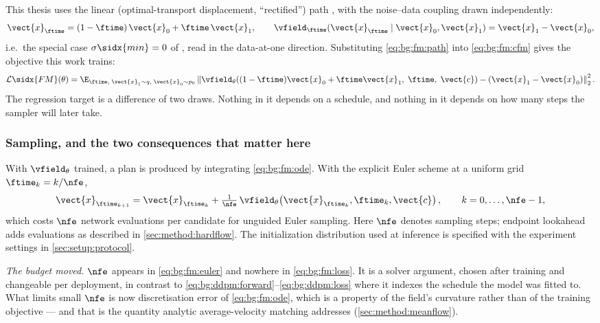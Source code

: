 This thesis uses the linear (optimal-transport displacement, ``rectified'')
path \parencite{lipman2023flow,liu2023flow}, with the noise--data coupling drawn independently:
\begin{equation}\label{eq:bg:fm:path}
  \vect{x}_{\ftime} = (1-\ftime)\,\vect{x}_{0} + \ftime\,\vect{x}_{1},
  \qquad
  \vfield_{\ftime}(\vect{x}_{\ftime}\mid \vect{x}_{0},\vect{x}_{1}) = \vect{x}_{1} - \vect{x}_{0},
\end{equation}
i.e.\ the special case $\sigma\sidx{min} = 0$ of \parencite[Eq.~(20)--(23)]{lipman2023flow}, read in
the data-at-one direction. Substituting \eqref{eq:bg:fm:path} into \eqref{eq:bg:fm:cfm} gives
the objective this work trains:
\begin{equation}\label{eq:bg:fm:loss}
  \mathcal{L}\sidx{FM}(\theta)
  = \E_{\ftime,\;\vect{x}_{1}\sim q,\;\vect{x}_{0}\sim p_{0}}
    \left\|\vfield_{\theta}\!\left((1-\ftime)\vect{x}_{0} + \ftime\vect{x}_{1},\;\ftime,\;\vect{c}\right)
      - \left(\vect{x}_{1}-\vect{x}_{0}\right)\right\|_{2}^{2}.
\end{equation}
The regression target is a difference of two draws. Nothing in it depends on a schedule, and
nothing in it depends on how many steps the sampler will later take.

\subsubsection*{Sampling, and the two consequences that matter here}

With $\vfield_{\theta}$ trained, a plan is produced by integrating \eqref{eq:bg:fm:ode}. With
the explicit Euler scheme at a uniform grid $\ftime_{k} = k/\nfe$,
\begin{equation}\label{eq:bg:fm:euler}
  \vect{x}_{\ftime_{k+1}} = \vect{x}_{\ftime_{k}}
    + \tfrac{1}{\nfe}\,\vfield_{\theta}\!\left(\vect{x}_{\ftime_{k}},\ftime_{k},\vect{c}\right),
  \qquad k = 0,\dots,\nfe-1,
\end{equation}
which costs $\nfe$ network evaluations per candidate for unguided Euler sampling. Here $\nfe$
denotes sampling steps; endpoint lookahead adds evaluations as described in
\autoref{sec:method:hardflow}. The initialization distribution used at inference is specified with
the experiment settings in \autoref{sec:setup:protocol}.

\emph{The budget moved.} $\nfe$ appears in \eqref{eq:bg:fm:euler} and nowhere in
\eqref{eq:bg:fm:loss}. It is a solver argument, chosen after training and changeable per
deployment, in contrast to \eqref{eq:bg:ddpm:forward}--\eqref{eq:bg:ddpm:loss} where it
indexes the schedule the model was fitted to. What limits small $\nfe$ is now discretisation
error of \eqref{eq:bg:fm:ode}, which is a property of the field's curvature rather than of the
training objective --- and that is the quantity analytic average-velocity matching addresses
(\autoref{sec:method:meanflow}).

